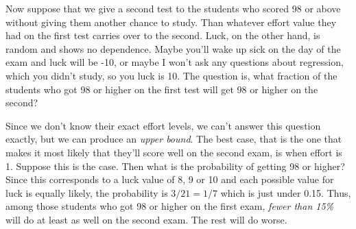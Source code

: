 \documentclass[12pt]{article}
\begin{document}
Now suppose that we give a second test to the students who scored 98 or above without giving them another chance to study.
Than whatever effort value they had on the first test carries over to the second.
Luck, on the other hand, is random and shows no dependence.
Maybe you'll wake up sick on the day of the exam and luck will be -10, or maybe I won't ask any questions about regression, which you didn't study, so you luck is 10.
The question is, what fraction of the students who got 98 or higher on the first test will get 98 or higher on the second?

Since we don't know their exact effort levels, we can't answer this question exactly, but we can produce an \emph{upper bound}.
The best case, that is the one that makes it most likely that they'll score well on the second exam, is when effort is 1.
Suppose this is the case.
Then what is the probability of getting 98 or higher?
Since this corresponds to a luck value of 8, 9 or 10 and each possible value for luck is equally likely, the probability is $3/21 = 1/7$ which is just under 0.15.
Thus, among those students who got 98 or higher on the first exam, \emph{fewer than 15\%} will do at least as well on the second exam.
The rest will do worse.
\end{document}

